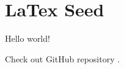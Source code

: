 \section{LaTex Seed} %
\label{sec:latex_seed}

Hello world!

Check out GitHub repository \cite{githubrepo}.

 